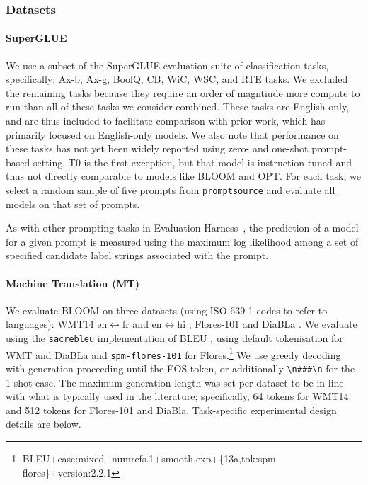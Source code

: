 \subsubsection{Datasets} 

\paragraph{SuperGLUE} We use a subset of the SuperGLUE \citep{wang-et-al-2019-superglue} evaluation suite of classification tasks, specifically: Ax-b, Ax-g, BoolQ, CB, WiC, WSC, and RTE tasks. We excluded the remaining tasks because they require an order of magntiude more compute to run than all of these tasks we consider combined. These tasks are English-only, and are thus included to facilitate comparison with prior work, which has primarily focused on English-only models. We also note that performance on these tasks has not yet been widely reported using zero- and one-shot prompt-based setting. T0 \citep{sanh2022multitask} is the first exception, but that model is instruction-tuned and thus not directly comparable to models like BLOOM and OPT. For each task, we select a random sample of five prompts from \texttt{promptsource} and evaluate all models on that set of prompts.

As with other prompting tasks in Evaluation Harness~\citep{eval-harness}, the prediction of a model for a given prompt is measured using the maximum log likelihood among a set of specified candidate label strings associated with the prompt. 

\paragraph{Machine Translation (MT)} We evaluate BLOOM on three datasets (using ISO-639-1 codes to refer to languages): WMT14 en$\leftrightarrow$fr and en$\leftrightarrow$hi \citep{bojar-etal-2014-findings}, Flores-101 \citep{goyal-etal-2022-flores} and DiaBLa \citep{bawden-et-al-2020-diabla}. We evaluate using the \texttt{sacrebleu} \citep{post-2018-call} implementation of BLEU \citep{papineni-etal-2002-bleu}, using default tokenisation for WMT and DiaBLa and \texttt{spm-flores-101} for Flores.\footnote{BLEU+case:mixed+numrefs.1+smooth.exp+\{13a,tok:spm-flores\}+version:2.2.1} We use greedy decoding with generation proceeding until the EOS token, or additionally \texttt{\textbackslash n\#\#\#\textbackslash n} for the 1-shot case. The maximum generation length was set per dataset to be in line with what is typically used in the literature; specifically, 64 tokens for WMT14 and 512 tokens for Flores-101 and DiaBla. Task-specific experimental design details are below.

